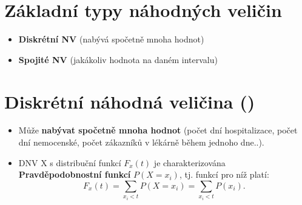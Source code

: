 \section{Základní typy náhodných veličin}
\begin{itemize}
    \item \textbf{Diskrétní NV} (nabývá spočetně mnoha hodnot)
    \item \textbf{Spojité NV} (jakákoliv hodnota na daném intervalu)
\end{itemize}

\section{Diskrétní náhodná veličina ()}
\begin{itemize}
    \item Může \textbf{nabývat spočetně mnoha hodnot} (počet dní hospitalizace, počet dní nemocenské, počet zákazníků v lékárně během jednoho dne..).
    \item DNV X s distribuční funkcí $F_x(t)$ je charakterizována \textbf{Pravděpodobnostní funkcí} $P(X = x_i)$, tj. funkcí pro níž platí:
          \begin{equation*}
              F_x(t) = \sum_{x_i<t}P(X = x_i)= \sum_{x_i<t}P(x_i).
          \end{equation*}
\end{itemize}
